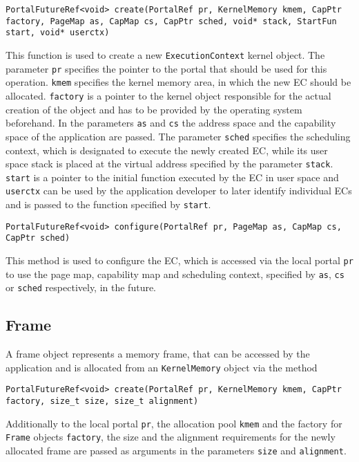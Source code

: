 \lstset{language=c++,numbers=none}
\begin{lstlisting}
PortalFutureRef<void> create(PortalRef pr, KernelMemory kmem, CapPtr factory, PageMap as, CapMap cs, CapPtr sched, void* stack, StartFun start, void* userctx)
\end{lstlisting}
This function is used to create a new \texttt{ExecutionContext} kernel object.
The parameter \texttt{pr} specifies the pointer to the portal that should be
used for this operation. \texttt{kmem} specifies the kernel memory area, in
which the new EC should be allocated. \texttt{factory} is a pointer to the
kernel object responsible for the actual creation of the object and has to be
provided by the operating system beforehand. In the parameters \texttt{as} and
\texttt{cs} the address space and the capability space of the application are
passed. The parameter \texttt{sched} specifies the scheduling context, which is
designated to execute the newly created EC, while its user space stack is placed
at the virtual address specified by the parameter \texttt{stack}.
\texttt{start} is a pointer to the initial function executed by the EC in user
space and \texttt{userctx} can be used by the application developer to later
identify individual ECs and is passed to the function specified by
\texttt{start}.

\lstset{language=c++,numbers=none}
\begin{lstlisting}
PortalFutureRef<void> configure(PortalRef pr, PageMap as, CapMap cs, CapPtr sched)
\end{lstlisting}
This method is used to configure the EC, which is accessed via
the local portal \texttt{pr} to use the page map, capability map and
scheduling context, specified by \texttt{as}, \texttt{cs} or \texttt{sched}
respectively, in the future.

\subsection{Frame}
A frame object represents a memory frame, that can be accessed by the
application and is allocated from an \texttt{KernelMemory} object via the
method
\lstset{language=c++,numbers=none}
\begin{lstlisting}
PortalFutureRef<void> create(PortalRef pr, KernelMemory kmem, CapPtr factory, size_t size, size_t alignment)
\end{lstlisting}
\noindent Additionally to the local
portal \texttt{pr}, the allocation pool \texttt{kmem} and the factory for
\texttt{Frame} objects \texttt{factory}, the size and the alignment requirements
for the newly allocated frame are passed as arguments in the parameters
\texttt{size} and \texttt{alignment}.

